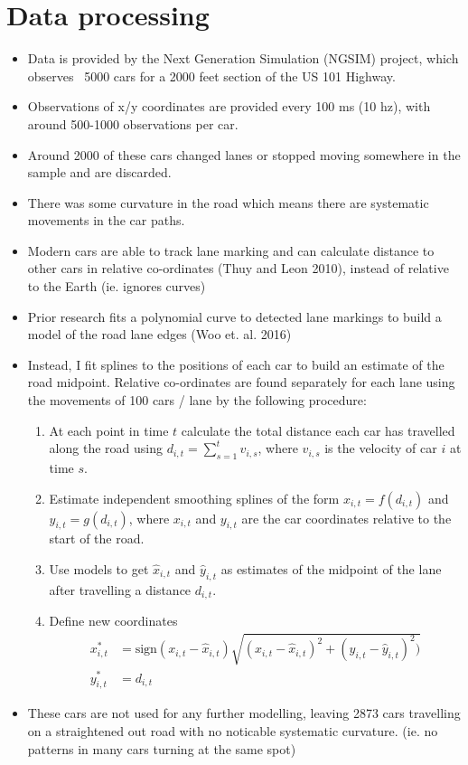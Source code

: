 \documentclass[12pt,a4paper]{article}\usepackage[]{graphicx}\usepackage[]{color}
\begin{document}
\section{Data processing}

\begin{itemize}
\item Data is provided by the Next Generation Simulation (NGSIM) project, which observes ~5000 cars for a 2000 feet section of the US 101 Highway.
\item Observations of x/y coordinates are provided every 100 ms (10 hz), with around 500-1000 observations per car.
\item Around 2000 of these cars changed lanes or stopped moving somewhere in the sample and are discarded.
\item There was some curvature in the road which means there are systematic movements in the car paths.
\item Modern cars are able to track lane marking and can calculate distance to other cars in relative co-ordinates (Thuy and Leon 2010), instead of relative to the Earth (ie. ignores curves)
\item Prior research fits a polynomial curve to detected lane markings to build a model of the road lane edges (Woo et. al. 2016) 
\item Instead, I fit splines to the positions of each car to build an estimate of the road midpoint. Relative co-ordinates are found separately for each lane using the movements of 100 cars / lane by the following procedure:
\begin{enumerate}
\item At each point in time $t$ calculate the total distance each car has travelled along the road using $d_{i, t} = \sum_{s=1}^t v_{i, s}$, where $v_{i, s}$ is the velocity of car $i$ at time $s$. 
\item Estimate independent smoothing splines of the form $x_{i, t} = f(d_{i, t})$ and $y_{i, t} = g(d_{i, t})$, where $x_{i, t}$ and $y_{i, t}$ are the car coordinates relative to the start of the road.
\item Use models to get $\hat{x}_{i, t}$ and $\hat{y}_{i, t}$ as estimates of the midpoint of the lane after travelling a distance $d_{i, t}$.
\item Define new coordinates 
\begin{align}
x^*_{i, t} &= \mbox{sign}(x_{i, t} - \hat{x}_{i, t})\sqrt{(x_{i, t}-\hat{x}_{i, t})^2 + (y_{i, t} - \hat{y}_{i, t})^2)} \label{xRel} \\
y^*_{i, t} &= d_{i, t} \label{yRel}
\end{align}
\end{enumerate}
\item These cars are not used for any further modelling, leaving 2873 cars travelling on a straightened out road with no noticable systematic curvature. (ie. no patterns in many cars turning at the same spot)
\end{itemize}
\end{document}
